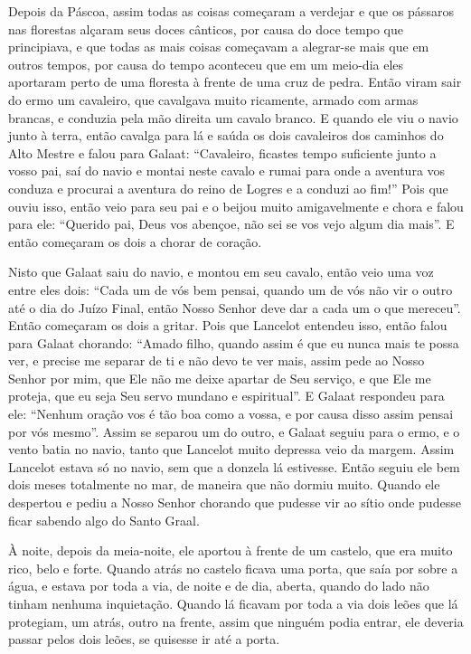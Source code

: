 Depois da Páscoa, assim todas as coisas começaram a verdejar e que os pássaros
nas florestas alçaram seus doces cânticos, por causa do doce tempo que
principiava, e que todas as mais coisas começavam a alegrar-se mais que em
outros tempos, por causa do tempo aconteceu que em um meio-dia eles aportaram
perto de uma floresta à frente de uma cruz de pedra. Então viram sair do ermo
um cavaleiro, que cavalgava muito ricamente, armado com armas brancas, e
conduzia pela mão direita um cavalo branco. E quando ele viu o navio junto à
terra, então cavalga para lá e saúda os dois cavaleiros dos caminhos do Alto
Mestre e falou para Galaat: “Cavaleiro, ficastes tempo suficiente junto a vosso
pai, saí do navio e montai neste cavalo e rumai para onde a aventura vos
conduza e procurai a aventura do reino de Logres e a conduzi ao fim!” Pois que
ouviu isso, então veio para seu pai e o beijou muito amigavelmente e chora e
falou para ele: “Querido pai, Deus vos abençoe, não sei se vos vejo algum dia
mais”. E então começaram os dois a chorar de coração.

Nisto que Galaat saiu do navio, e montou em seu cavalo, então veio uma voz entre
eles dois: “Cada um de vós bem pensai, quando um de vós não vir o outro até o
dia do Juízo Final, então Nosso Senhor deve dar a cada um o que mereceu”. 
Então começaram os dois a gritar. Pois que Lancelot entendeu isso, então
falou para Galaat chorando: “Amado filho, quando assim é que eu nunca mais te
possa ver, e precise me separar de ti e não devo te ver mais, assim pede ao
Nosso Senhor por mim, que Ele não me deixe apartar de Seu serviço, e que Ele me
proteja, que eu seja Seu servo mundano e espiritual”. E Galaat respondeu para
ele: “Nenhum oração vos é tão boa como a vossa, e por causa disso assim pensai
por vós mesmo”. Assim se separou um do outro, e Galaat seguiu para o ermo, e o
vento batia no navio, tanto que Lancelot muito depressa veio da margem. Assim
Lancelot estava só no navio, sem que a donzela lá estivesse. Então seguiu ele
bem dois meses totalmente no mar, de maneira que não dormiu muito. Quando ele
despertou e pediu a Nosso Senhor chorando que pudesse vir ao sítio onde pudesse
ficar sabendo algo do Santo Graal. 

À noite, depois da meia-noite, ele aportou à frente de um castelo, que era muito
rico, belo e forte. Quando atrás no castelo ficava uma porta, que saía por
sobre a água, e estava por toda a via, de noite e de dia, aberta, quando do
lado não tinham nenhuma inquietação. Quando lá ficavam por toda a via dois
leões que lá protegiam, um atrás, outro na frente, assim que ninguém podia
entrar, ele deveria passar pelos dois leões, se quisesse ir até a porta.

